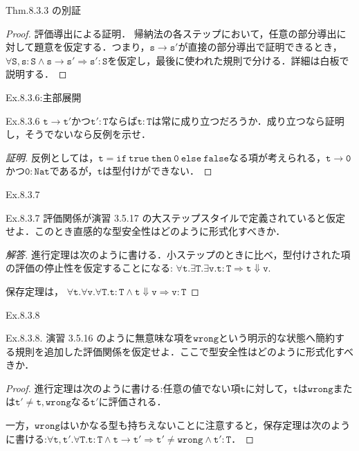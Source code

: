 \documentclass[9pt]{beamer}
\begin{document}
\begin{frame}{Thm.8.3.3 の別証}
\begin{proof}{評価導出による証明．}
帰納法の各ステップにおいて，任意の部分導出に対して題意を仮定する．つまり，$\mathtt{s \rightarrow s'}$が直接の部分導出で証明できるとき，$\mathtt{\forall S, s: S\land s \rightarrow s' \Rightarrow s' :S}$を仮定し，最後に使われた規則で分ける．詳細は白板で説明する．
\end{proof}
\end{frame}
\begin{frame}{Ex.8.3.6:主部展開}
\begin{alertblock}{Ex.8.3.6}
$\mathtt{t\rightarrow t'}$かつ$\mathtt{t':T}$ならば$\mathtt{t:T}$は常に成り立つだろうか．成り立つなら証明し，そうでないなら反例を示せ．
\end{alertblock}
\begin{proof}[証明]
反例としては，$\mathtt{t = if\ true\ then\ 0\ else\ false}$なる項が考えられる，$\mathtt{t\rightarrow 0}$かつ$\mathtt{0:Nat}$であるが，$\mathtt{t}$は型付けができない．
\end{proof}
\end{frame}
\begin{frame}{Ex.8.3.7}
\begin{alertblock}{Ex.8.3.7}
評価関係が演習 3.5.17 の大ステップスタイルで定義されていると仮定せよ．このとき直感的な型安全性はどのように形式化すべきか．
\end{alertblock}
\begin{proof}[解答]
進行定理は次のように書ける．小ステップのときに比べ，型付けされた項の評価の停止性を仮定することになる:
$\mathtt{\forall t. \exists T.\exists v. t:T \Rightarrow t\Downarrow v}$.

保存定理は，
$\mathtt{\forall t. \forall v. \forall T. t:T \land t \Downarrow v \Rightarrow v:T}$
\end{proof}
\end{frame}
\begin{frame}{Ex.8.3.8}
\begin{alertblock}{Ex.8.3.8.}
演習 3.5.16 のように無意味な項を$\mathtt{wrong}$という明示的な状態へ簡約する規則を追加した評価関係を仮定せよ．ここで型安全性はどのように形式化すべきか．
\end{alertblock}
\begin{proof}
進行定理は次のように書ける:任意の値でない項$\mathtt{t}$に対して，$\mathtt{t}$は$\mathtt{wrong}$または$\mathtt{t'\neq t, wrong}$なる$\mathtt{t'}$に評価される．

一方，$\mathtt{wrong}$はいかなる型も持ちえないことに注意すると，保存定理は次のように書ける:$\mathtt{\forall t, t'.\forall T. t:T \land t\rightarrow t'\Rightarrow t'\neq wrong \land t':T}$．
\end{proof}
\end{frame}
\end{document}
